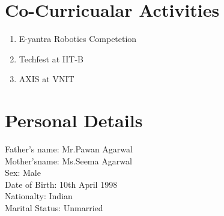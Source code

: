 \documentclass{article}
\begin{document}
\section{Co-Curricualar Activities}
\begin{enumerate}
	\item E-yantra Robotics Competetion
	\item Techfest at IIT-B
	\item AXIS at VNIT
\end{enumerate}
\section{Personal Details}
Father's name: Mr.Pawan Agarwal \\
Mother'sname: Ms.Seema Agarwal \\
Sex: Male \\
Date of Birth: 10th April 1998\\
Nationalty: Indian\\
Marital Status: Unmarried\\
\end{document}
